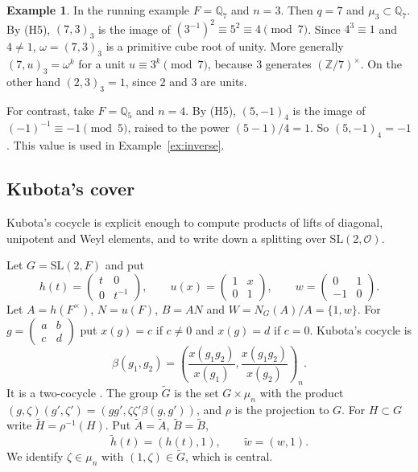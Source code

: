 \documentclass[12pt,letterpaper]{article}
\numberwithin{equation}{section}
\theoremstyle{plain}
\theoremstyle{definition}
\newtheorem{example}[theorem]{Example}
\theoremstyle{remark}
\newcommand{\Gt}{\widetilde G}
\newcommand{\At}{\widetilde A}
\newcommand{\Bt}{\widetilde B}
\newcommand{\hl}{\tilde h}
\newcommand{\wt}{\tilde w}
\newcommand{\Zz}{\mathbb Z}
\newcommand{\Qq}{\mathbb Q}
\newcommand{\Of}{\mathcal O}
\newcommand{\SL}{\mathrm{SL}}
\begin{document}
\begin{example}\label{ex:hilbert}
In the running example $F=\Qq_7$ and $n=3$. Then $q=7$ and
$\mu_3\subset\Qq_7$. By (H5), $(7,3)_3$ is the image of
$(3^{-1})^2\equiv5^2\equiv4\pmod7$. Since $4^3\equiv1$ and $4\ne1$,
$\omega=(7,3)_3$ is a primitive cube root of unity. More generally
$(7,u)_3=\omega^{k}$ for a unit $u\equiv3^k\pmod7$, because $3$
generates $(\Zz/7)^\times$. On the other hand $(2,3)_3=1$, since $2$
and $3$ are units.

For contrast, take $F=\Qq_5$ and $n=4$. By (H5), $(5,-1)_4$ is the image of
$(-1)^{-1}\equiv-1\pmod5$, raised to the power $(5-1)/4=1$. So $(5,-1)_4=-1$. This value is used
in Example~\ref{ex:inverse}.
\end{example}

\subsection{Kubota's cover}\label{subsec:kubota}

Kubota's cocycle is explicit enough to compute products of lifts of
diagonal, unipotent and Weyl elements, and to write down a splitting
over $\SL(2,\Of)$.

Let $G=\SL(2,F)$ and put
\[
h(t)=\begin{pmatrix}t&0\\0&t^{-1}\end{pmatrix},\qquad
u(x)=\begin{pmatrix}1&x\\0&1\end{pmatrix},\qquad
w=\begin{pmatrix}0&1\\-1&0\end{pmatrix}.
\]
Let $A=h(F^\times)$, $N=u(F)$, $B=AN$ and $W=N_G(A)/A=\{1,w\}$. For
$g=\left(\begin{smallmatrix}a&b\\c&d\end{smallmatrix}\right)$ put
$x(g)=c$ if $c\ne0$ and $x(g)=d$ if $c=0$. Kubota's cocycle is
\begin{equation}\label{eq:kubota}
\beta(g_1,g_2)=
\left(\frac{x(g_1g_2)}{x(g_1)},\frac{x(g_1g_2)}{x(g_2)}\right)_n .
\end{equation}
It is a two-cocycle \cite[\S1]{Ku67}. The group $\Gt$ is the set
$G\times\mu_n$ with the product
$(g,\zeta)(g',\zeta')=(gg',\zeta\zeta'\beta(g,g'))$, and $\rho$ is the
projection to $G$. For $H\subset G$ write $\widetilde H=\rho^{-1}(H)$.
Put $\At=\widetilde A$, $\Bt=\widetilde B$,
\[
\hl(t)=(h(t),1),\qquad \wt=(w,1).
\]
We identify $\zeta\in\mu_n$ with $(1,\zeta)\in\Gt$, which is central.
\end{document}
